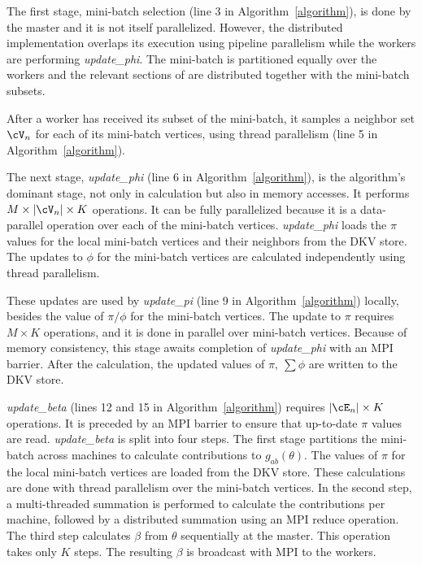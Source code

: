 The first stage, mini-batch selection (line 3 in Algorithm~\ref{algorithm}),
is done by the master and it is
not itself parallelized. However, the distributed implementation overlaps
its execution using pipeline parallelism while the workers are
performing \textit{update\_phi}. The mini-batch is partitioned equally over
the workers and the relevant sections of \Edges are distributed together with the
mini-batch subsets.

After a worker has received its subset of the mini-batch, it samples a neighbor
set $\Neighbors$ for each of its mini-batch vertices, using thread parallelism
(line 5 in Algorithm~\ref{algorithm}).

The next stage, \textit{update\_phi} (line 6 in Algorithm~\ref{algorithm}), is the algorithm's dominant stage, not
only in calculation but also in memory accesses. It performs $M \times
|\Neighbors| \times
K$ operations. It can be fully parallelized because it is a data-parallel
operation over each of the mini-batch vertices. \textit{update\_phi} loads the
$\pi$ values for the local mini-batch vertices and their neighbors from the
DKV store. The updates to $\phi$ for the mini-batch vertices are calculated
independently using thread parallelism.

These updates are used by \textit{update\_pi} (line 9 in
Algorithm~\ref{algorithm}) locally, besides the value of
$\pi/\phi$ for the mini-batch vertices. The update to $\pi$ requires
$M \times K$ operations, and it is done in parallel over mini-batch vertices. Because of
memory consistency, this stage awaits completion of \textit{update\_phi} with
an MPI barrier. After the calculation, the updated values of $\pi,~\sum\phi$
are written to the DKV store.

\textit{update\_beta} (lines 12 and 15 in Algorithm~\ref{algorithm}) requires $|\Minibatch| \times K$ operations. It is preceded by an MPI
barrier to ensure that up-to-date $\pi$ values are read. \textit{update\_beta}
is split into four steps. The first stage partitions the mini-batch across
machines to calculate contributions to $g_{ab}(\theta)$. The values of $\pi$ for
the local mini-batch vertices are loaded from the DKV store. These calculations
are done with thread parallelism over the mini-batch vertices. In the second step,
a multi-threaded summation is performed to calculate the contributions per
machine, followed by a distributed summation using an MPI reduce operation. The
third step calculates $\beta$ from $\theta$ sequentially at the master. This
operation takes only $K$ steps. The resulting $\beta$ is broadcast with MPI
to the workers.

